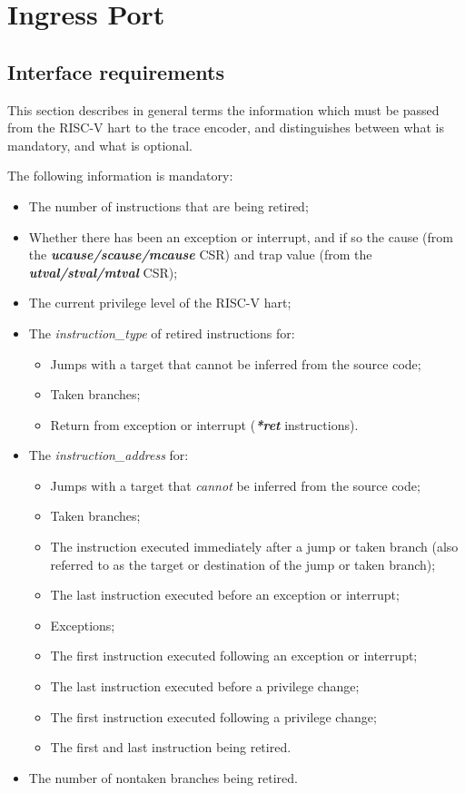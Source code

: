 \chapter{Ingress Port} \label{Interface}

\section{Interface requirements}
This section describes in general terms the information which must be passed from the RISC-V hart to the trace encoder,
and distinguishes between what is mandatory, and what is optional.

The following information is mandatory:

\begin{itemize}
  \item The number of instructions that are being retired;
  \item Whether there has been an exception or interrupt, and if so the cause (from the \textbf{\textit{ucause/scause/mcause}} CSR)
        and trap value (from the \textbf{\textit{utval/stval/mtval}} CSR);
  \item The current privilege level of the RISC-V hart;
  \item The \textit{instruction\_type} of retired instructions for:
    \begin{itemize}
      \item Jumps with a target that cannot be inferred from the source code;
      \item Taken branches;
      \item Return from exception or interrupt (\textbf{\textit{*ret}} instructions).
    \end{itemize}
  \item The \textit{instruction\_address} for:
    \begin{itemize}
      \item Jumps with a target that \textit{cannot} be inferred from the source code;
      \item Taken branches;
      \item The instruction executed immediately after a jump or taken branch (also referred to as the target or destination of the jump or taken branch);
      \item The last instruction executed before an exception or interrupt;
      \item Exceptions;
      \item The first instruction executed following an exception or interrupt;
      \item The last instruction executed before a privilege change;
      \item The first instruction executed following a privilege change;
      \item The first and last instruction being retired.
    \end{itemize}
  \item The number of nontaken branches being retired.
\end{itemize}

